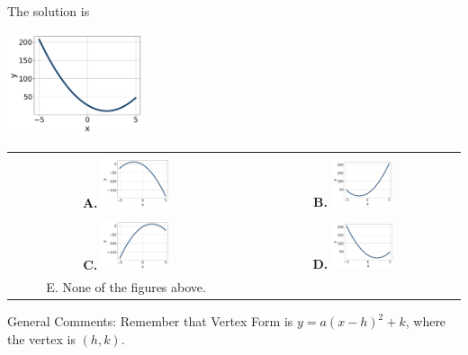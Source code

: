 \documentclass{article}[14pt]
\begin{document}
 
 The solution is  
 \begin{center} \includegraphics[width=0.3\textwidth]{../Figures/quadraticEquationToGraphDC.png} \end{center}\begin{tabular}{|c|c|} 
\hline 
 & \tabularnewline 
 \textbf{A.} \includegraphics[width=0.3\textwidth]{../Figures/quadraticEquationToGraphAC.png} & \textbf{B.} \includegraphics[width=0.3\textwidth]{../Figures/quadraticEquationToGraphBC.png} \tabularnewline 
\hline 
 & \tabularnewline 
 \textbf{C.} \includegraphics[width=0.3\textwidth]{../Figures/quadraticEquationToGraphCC.png} & \textbf{D.} \includegraphics[width=0.3\textwidth]{../Figures/quadraticEquationToGraphDC.png} \tabularnewline 
\hline 
 E. None of the figures above. & \tabularnewline 
\hline 
 \end{tabular} 
 
General Comments: Remember that Vertex Form is $y = a(x-h)^2+k$, where the vertex is $(h, k)$.
\end{document}
